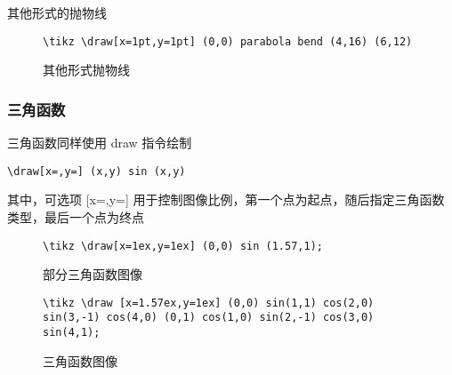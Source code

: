 其他形式的抛物线
\begin{figure}[H]
    \centering
    \begin{minipage}{0.35\linewidth}
        \centering
    \end{minipage}
    \begin{minipage}{0.55\linewidth}
        \begin{lstlisting}[style = latex-side]
    \tikz \draw[x=1pt,y=1pt] (0,0) parabola bend (4,16) (6,12)
        \end{lstlisting}
    \end{minipage}
    \caption{其他形式抛物线}
\end{figure}

\subsubsection{三角函数}
三角函数同样使用 draw 指令绘制
\begin{lstlisting}[style = latex]
    \draw[x=,y=] (x,y) sin (x,y)
\end{lstlisting}
其中，可选项 [x=,y=] 用于控制图像比例，第一个点为起点，随后指定三角函数类型，最后一个点为终点

\begin{figure}[H]
    \centering
    \begin{minipage}{0.35\linewidth}
        \centering
    \end{minipage}
    \begin{minipage}{0.55\linewidth}
        \begin{lstlisting}[style = latex-side]
            \tikz \draw[x=1ex,y=1ex] (0,0) sin (1.57,1);
        \end{lstlisting}
    \end{minipage}
    \caption{部分三角函数图像}
\end{figure}

\begin{figure}[H]
    \centering
    \begin{minipage}{0.35\linewidth}
        \centering
    \end{minipage}
    \begin{minipage}{0.55\linewidth}
        \begin{lstlisting}[style = latex-side]
    \tikz \draw [x=1.57ex,y=1ex] (0,0) sin(1,1) cos(2,0) sin(3,-1) cos(4,0) (0,1) cos(1,0) sin(2,-1) cos(3,0) sin(4,1);
        \end{lstlisting}
    \end{minipage}
    \caption{三角函数图像}
\end{figure}

